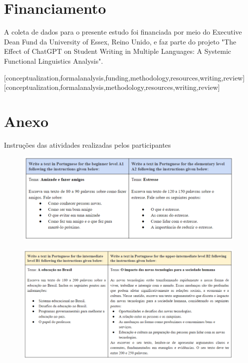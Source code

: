 \documentclass[portuguese]{textolivre}
\begin{document}
\section{Financiamento}\label{sec-conclusao}
A coleta de dados para o presente estudo foi financiada por meio do Executive Dean Fund da University of Essex, Reino Unido, e faz parte do projeto "The Effect of ChatGPT on Student Writing in Multiple Languages: A Systemic Functional Linguistics Analysis".


\printbibliography\label{sec-bib}


\begin{contributors}
[conceptualization,formalanalysis,funding,methodology,resources,writing,review]
[conceptualization,formalanalysis,methodology,resources,writing,review]
\end{contributors}

\appendix 
\section{Anexo}\label{apx-longtable}
Instruções das atividades realizadas pelos participantes

\begin{figure}[h!]
    \centering
    \includegraphics[width=0.8\linewidth]{Fig22.png}
    \label{fig22}
\end{figure}

\begin{figure}[h!]
    \centering
    \includegraphics[width=0.8\linewidth]{Fig23.png}
    \label{fig23}
\end{figure}
\end{document}
